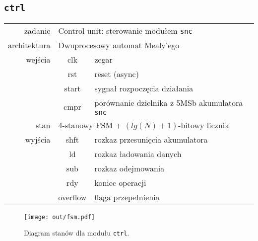 \documentclass[a4paper]{article}
\begin{document}
\subsection{\texttt{ctrl}}
\begin{table}[!h]
	\begin{tabular}{r|c l}
		zadanie      & \multicolumn{2}{l}{Control unit: sterowanie modułem \texttt{snc}} \\
		architektura & \multicolumn{2}{l}{Dwuprocesowy automat Mealy'ego} \\
		\hline
		wejścia      & clk         & zegar             \\
		             & rst         & reset (async)     \\
		             & start       & sygnał rozpoczęcia działania \\
		             & cmpr        & porównanie dzielnika z 5MSb akumulatora \texttt{snc} \\
		\hline
		stan         & \multicolumn{2}{l}{4-stanowy FSM + $(lg(N)+1)$-bitowy licznik} \\
		\hline
		wyjścia      & shft     & rozkaz przesunięcia akumulatora \\
		             & ld       & rozkaz ładowania danych \\
		             & sub      & rozkaz odejmowania      \\
		             & rdy      & koniec operacji     \\
		             & overflow & flaga przepełnienia \\
	\end{tabular}
\end{table}
\begin{figure}[!ht]
	\centering
	\texttt{[image: out/fsm.pdf]}
	\caption{Diagram stanów dla modułu \texttt{ctrl}.}
	\label{fig:test}
\end{figure}
\end{document}
